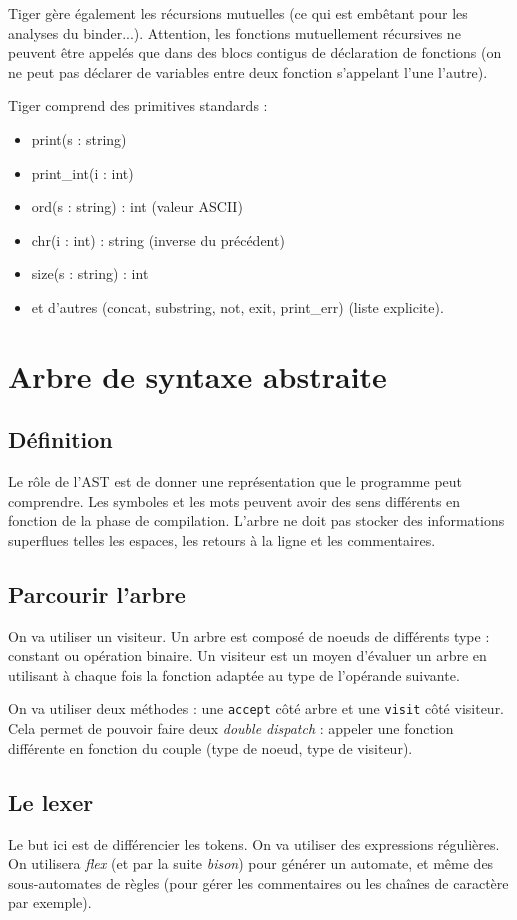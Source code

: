 \documentclass{article}
\begin{document}
Tiger gère également les récursions mutuelles (ce qui est embêtant pour les analyses du binder...). Attention, les fonctions mutuellement récursives ne peuvent être appelés que dans des blocs contigus de déclaration de fonctions (on ne peut pas déclarer de variables entre deux fonction s'appelant l'une l'autre).

Tiger comprend des primitives standards :
\begin{itemize}
\item print(s : string)
\item print\_int(i : int)
\item ord(s : string) : int (valeur ASCII)
\item chr(i : int) : string (inverse du précédent)
\item size(s : string) : int
\item et d'autres (concat, substring, not, exit, print\_err) (liste explicite).
\end{itemize}


\section{Arbre de syntaxe abstraite}

\subsection{Définition}
Le rôle de l'AST est de donner une représentation que le programme peut comprendre. Les symboles et les mots peuvent avoir des sens différents en fonction de la phase de compilation. L'arbre ne doit pas stocker des informations superflues telles les espaces, les retours à la ligne et les commentaires.


\subsection{Parcourir l'arbre}
On va utiliser un visiteur. Un arbre est composé de noeuds de différents type : constant ou opération binaire. Un visiteur est un moyen d'évaluer un arbre en utilisant à chaque fois la fonction adaptée au type de l'opérande suivante.

On va utiliser deux méthodes : une \texttt{accept} côté arbre et une \texttt{visit} côté visiteur. Cela permet de pouvoir faire deux \emph{double dispatch} : appeler une fonction différente en fonction du couple (type de noeud, type de visiteur).

\subsection{Le lexer}
Le but ici est de différencier les tokens. On va utiliser des expressions régulières. On utilisera \emph{flex} (et par la suite \emph{bison}) pour générer un automate, et même des sous-automates de règles (pour gérer les commentaires ou les chaînes de caractère par exemple).
\end{document}
